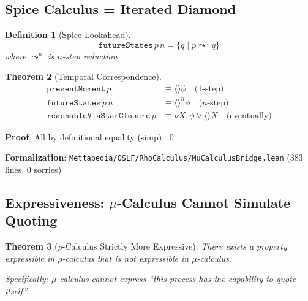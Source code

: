 \documentclass[11pt]{article}
\newtheorem{theorem}{Theorem}
\newtheorem{definition}[theorem]{Definition}
\begin{document}
\subsection{Spice Calculus = Iterated Diamond}

\begin{definition}[Spice Lookahead]
\[
\texttt{futureStates}\, p\, n = \{q \mid p \leadsto^n q\}
\]
where $\leadsto^n$ is $n$-step reduction.
\end{definition}

\begin{theorem}[Temporal Correspondence]
\begin{align*}
\texttt{presentMoment}\, p &\equiv \langle\rangle \phi \quad \text{(1-step)} \\
\texttt{futureStates}\, p\, n &\equiv \langle\rangle^n \phi \quad \text{($n$-step)} \\
\texttt{reachableViaStarClosure}\, p &\equiv \nu X.\, \phi \lor \langle\rangle X \quad \text{(eventually)}
\end{align*}
\end{theorem}

\textbf{Proof}: All by definitional equality (simp). \qed

\textbf{Formalization}: \texttt{Mettapedia/OSLF/RhoCalculus/MuCalculusBridge.lean} (383 lines, 0 sorries)

\subsection{Expressiveness: $\mu$-Calculus Cannot Simulate Quoting}

\begin{theorem}[$\rho$-Calculus Strictly More Expressive]\label{thm:rho-mu-expressiveness}
There exists a property expressible in $\rho$-calculus that is \emph{not} expressible in $\mu$-calculus.

Specifically: $\mu$-calculus cannot express ``this process has the capability to quote itself''.
\end{theorem}
\end{document}
